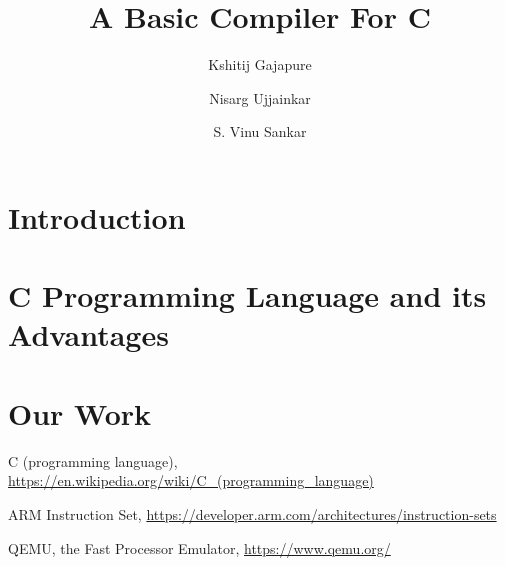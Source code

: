 \documentclass{clv3}
\title{A Basic Compiler For C}
\author{Kshitij Gajapure}
\affil{16110055}
\author{Nisarg Ujjainkar}
\affil{16110102}
\author{S. Vinu Sankar}
\affil{16110143}
\begin{document}
    \maketitle
    \section{Introduction}
    
    \section{C Programming Language and its Advantages}
    
    \section{Our Work}
    
    \begin{thebibliography}{9}
        
        C (programming language), \url{https://en.wikipedia.org/wiki/C_(programming_language)}

        ARM Instruction Set, \url{https://developer.arm.com/architectures/instruction-sets}

        QEMU, the Fast Processor Emulator, \url{https://www.qemu.org/}

    \end{thebibliography}
\end{document}
